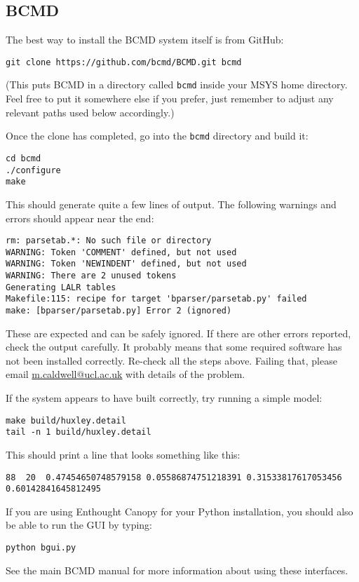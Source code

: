 \documentclass[a4paper,11pt]{article}
\begin{document}
\subsection{BCMD}\label{bcmd}

The best way to install the BCMD system itself is from GitHub:
\begin{verbatim}
git clone https://github.com/bcmd/BCMD.git bcmd
\end{verbatim}
(This puts BCMD in a directory called \texttt{bcmd} inside your MSYS home directory. Feel free to put it somewhere else if you prefer, just remember to adjust any relevant paths used below accordingly.)

Once the clone has completed, go into the \texttt{bcmd} directory and build it:
\begin{verbatim}
cd bcmd
./configure
make
\end{verbatim}
This should generate quite a few lines of output. The following warnings and errors should appear near the end:
\begin{verbatim}
rm: parsetab.*: No such file or directory
WARNING: Token 'COMMENT' defined, but not used
WARNING: Token 'NEWINDENT' defined, but not used
WARNING: There are 2 unused tokens
Generating LALR tables
Makefile:115: recipe for target 'bparser/parsetab.py' failed
make: [bparser/parsetab.py] Error 2 (ignored)
\end{verbatim}
These are expected and can be safely ignored. If there are other errors reported, check the output carefully. It probably means that some required software has not been installed correctly. Re-check all the steps above. Failing that, please email \href{mailto:m.caldwell@ucl.ac.uk}{m.caldwell@ucl.ac.uk} with details of the problem.

If the system appears to have built correctly, try running a simple model:
\begin{verbatim}
make build/huxley.detail
tail -n 1 build/huxley.detail
\end{verbatim}
This should print a line that looks something like this:
\begin{verbatim}
88	20	0.47454650748579158	0.05586874751218391	0.31533817617053456	0.60142841645812495
\end{verbatim}
If you are using Enthought Canopy for your Python installation, you should also be able to run the GUI by typing:
\begin{verbatim}
python bgui.py
\end{verbatim}
See the main BCMD manual for more information about using these interfaces.
\end{document}
